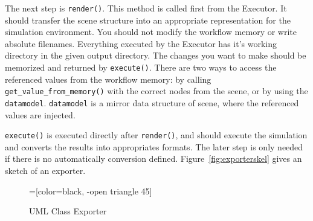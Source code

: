 The next step is \texttt{render()}. This method is
called first from the Executor. It should transfer the scene structure
into an appropriate representation for the simulation environment.
You should not modify the workflow memory or write absolute
filenames. Everything executed by the Executor has it's working
directory in the given output directory. The changes you want to make
should be memorized and returned by \texttt{execute()}.
There are two ways to access the referenced values from the workflow
memory: by calling \texttt{get\_value\_from\_memory()} with the correct
nodes from the scene, or by using the
\texttt{datamodel}. \texttt{datamodel} is a mirror data structure of scene,
where the referenced values are injected.

\texttt{execute()} is executed directly after \texttt{render()}, and
should execute the simulation and converts the results into
appropriates formats. The later step is only needed if there is no
automatically conversion defined.
Figure~\ref{fig:exporterskel} gives an sketch of an exporter.



\begin{figure}
  \centering
  =[color=black, -open triangle 45]

  \caption{UML Class Exporter}
  \label{fig:exporteruml}
\end{figure}

\begin{figure*}
  \centering
  
  \caption{Operator Definiton Example}
  \label{fig:exporterskel}
\end{figure*}


